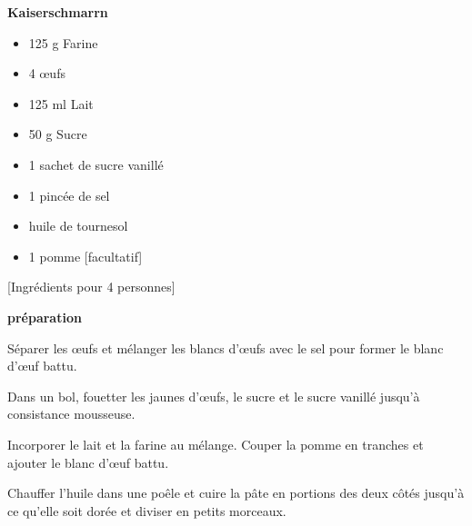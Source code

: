 

\parindent0pt	

\pagestyle{empty}


\textbf{{\LARGE Kaiserschmarrn}}%

\hrulefill
\vspace*{\fill}
\begin{multicols}{2}	


\begin{itemize}
\item 125 g Farine
\item 4 œufs
\item 125 ml Lait	
\item 50 g Sucre
\item 1 sachet de sucre vanillé 
\item 1 pincée de sel 
\item huile de tournesol
\item 1 pomme [facultatif]
\end{itemize}
\end{multicols}
\vfill									%

\vspace{1.5cm}
%
\begin{center}
%
[Ingrédients pour 4 personnes]%
\end{center}


\vfill
\newpage
\textbf{{\LARGE préparation}}%

\hrulefill

\vspace*{\fill}
\begin{multicols}{2}

Séparer les œufs et mélanger les blancs d'œufs avec le sel pour former le blanc d'œuf battu.\newline

Dans un bol, fouetter les jaunes d'œufs, le sucre et le sucre vanillé jusqu'à consistance mousseuse. \newline 

Incorporer le lait et la farine au mélange.\newline
Couper la pomme en tranches et ajouter le blanc d'œuf battu.\newline 


Chauffer l'huile dans une poêle et cuire la pâte en portions des deux côtés jusqu'à ce qu'elle soit dorée et diviser en petits morceaux.

\end{multicols}
\vfill

